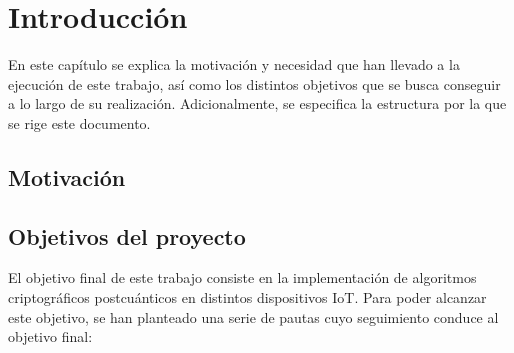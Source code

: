 % 
% 
% 
% 
% 
% 
% 
% 

\chapter{Introducción}\label{cha:introduccion}

En este capítulo se explica la motivación y necesidad que han llevado a la ejecución de este trabajo, así como los distintos objetivos que se busca conseguir a lo largo de su realización.
Adicionalmente, se especifica la estructura por la que se rige este documento.


\section{Motivación}\label{sec:motivacion}



\section{Objetivos del proyecto}\label{sec:objetivos}

El objetivo final de este trabajo consiste en la implementación de algoritmos criptográficos postcuánticos en distintos dispositivos \ac{IoT}.
Para poder alcanzar este objetivo, se han planteado una serie de pautas cuyo seguimiento conduce al objetivo final:

